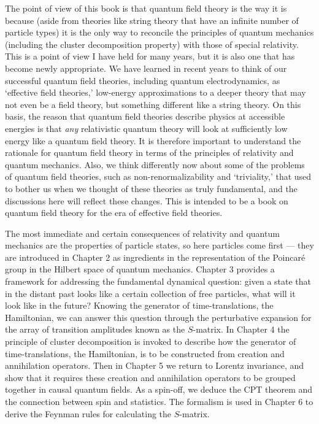 The point of view of this book is that quantum field theory is the way it is
because (aside from theories like string theory that have an infinite number of
particle types) it is the only way to reconcile the principles of quantum
mechanics (including the cluster decomposition property) with those of special
relativity. This is a point of view I have held for many years, but it is also
one that has become newly appropriate. We have learned in recent years to think
of our successful quantum field theories, including quantum electrodynamics, as
`effective field theories,' low-energy approximations to a deeper theory that
may not even be a field theory, but something different like a string theory. On
this basis, the reason that quantum field theories describe physics at
accessible energies is that \emph{any} relativistic quantum theory will look at
sufficiently low energy like a quantum field theory. It is therefore important
to understand the rationale for quantum field theory in terms of the principles
of relativity and quantum mechanics. Also, we think differently now about some
of the problems of quantum field theories, such as non-renormalizability and
`triviality,' that used to bother us when we thought of these theories as truly
fundamental, and the discussions here will reflect these changes. This is
intended to be a book on quantum field theory for the era of effective field
theories.

The most immediate and certain consequences of relativity and quantum mechanics
are the properties of particle states, so here particles come first --- they
are introduced in Chapter 2 as ingredients in the representation of the
Poincar\'e group in the Hilbert space of quantum mechanics. Chapter
3 provides a framework for addressing the fundamental dynamical question:
given a state that in the distant past looks like a certain collection of free
particles, what will it look like in the future? Knowing the generator of
time-translations, the Hamiltonian, we can answer this question through the
perturbative expansion for the array of transition amplitudes known as the
$S$-matrix. In Chapter 4 the principle of cluster decomposition is invoked to
describe how the generator of time-translations, the Hamiltonian, is to be
constructed from creation and annihilation operators. Then in Chapter 5 we
return to Lorentz invariance, and show that it requires these creation and
annihilation operators to be grouped together in causal quantum fields. As a
spin-off, we deduce the CPT theorem and the connection between spin and
statistics. The formalism is used in Chapter 6 to derive the Feynman rules for
calculating the $S$-matrix.

